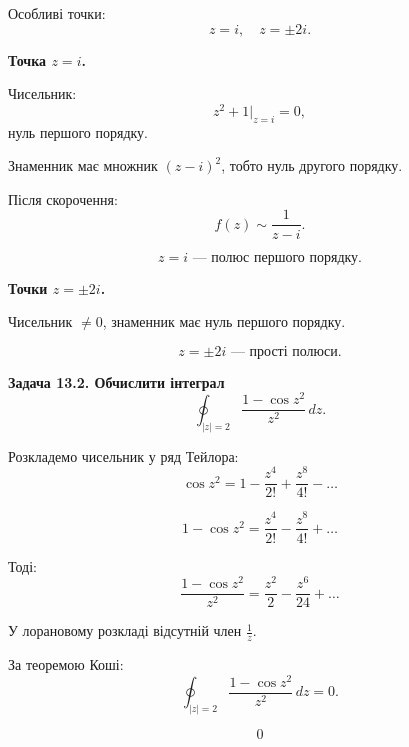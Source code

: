 \documentclass[12pt,a4paper]{article}
\begin{document}
Особливі точки:
\[
z=i,\quad z=\pm2i.
\]

\textbf{Точка \(z=i\).}

Чисельник:
\[
z^2+1\big|_{z=i}=0,
\]
нуль першого порядку.

Знаменник має множник \((z-i)^2\),
тобто нуль другого порядку.

Після скорочення:
\[
f(z)\sim\frac{1}{z-i}.
\]

\[
\boxed{z=i\text{ — полюс першого порядку}}.
\]

\textbf{Точки \(z=\pm2i\).}

Чисельник \(\neq0\), знаменник має нуль першого порядку.

\[
\boxed{z=\pm2i\text{ — прості полюси}}.
\]

\textbf{Задача 13.2. Обчислити інтеграл}
\[
\oint_{|z|=2}\frac{1-\cos z^2}{z^2}\,dz.
\]

Розкладемо чисельник у ряд Тейлора:
\[
\cos z^2
=
1-\frac{z^4}{2!}+\frac{z^8}{4!}-\dots
\]

\[
1-\cos z^2
=
\frac{z^4}{2!}-\frac{z^8}{4!}+\dots
\]

Тоді:
\[
\frac{1-\cos z^2}{z^2}
=
\frac{z^2}{2}-\frac{z^6}{24}+\dots
\]

У лорановому розкладі відсутній член \(\frac{1}{z}\).

За теоремою Коші:
\[
\oint_{|z|=2}\frac{1-\cos z^2}{z^2}\,dz=0.
\]

\[
\boxed{0}
\]





    
\end{document}
